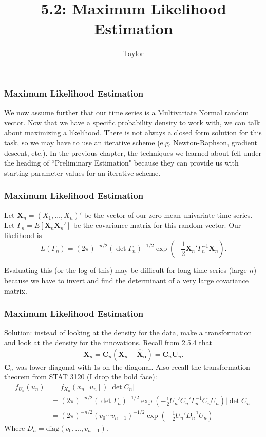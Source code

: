 \documentclass{beamer}
\title["5.2"]{5.2: Maximum Likelihood Estimation}
\author{Taylor}
\institute[UVA] 
{
University of Virginia \\
\medskip
\textit{} 
}
\date{}
\begin{document}

\begin{frame}
\titlepage 
\end{frame}

\begin{frame}
\frametitle{Maximum Likelihood Estimation}

We now assume further that our time series is a Multivariate Normal random vector. Now that we have a specific probability density to work with, we can talk about maximizing a likelihood. There is not always a closed form solution for this task, so we may have to use an iterative scheme (e.g. Newton-Raphson, gradient descent, etc.). In the previous chapter, the techniques we learned about fell under the heading of ``Preliminary Estimation" because they can provide us with starting parameter values for an iterative scheme. 

\end{frame}
\begin{frame}
\frametitle{Maximum Likelihood Estimation}
Let $\mathbf{X}_n = (X_1, \ldots, X_n)'$ be the vector of our zero-mean univariate time series. Let $\Gamma_n = E[\mathbf{X}_n\mathbf{X}_n']$ be the covariance matrix for this random vector. Our likelihood is
\[
L(\Gamma_n) = (2\pi)^{-n/2}(\det \Gamma_n)^{-1/2} \exp\left(-\frac{1}{2} \mathbf{X}_n' \Gamma_n^{-1} \mathbf{X}_n \right).
\]

Evaluating this (or the log of this) may be difficult for long time series (large $n$) because we have to invert and find the determinant of a very large covariance matrix. 
\end{frame}


\begin{frame}
\frametitle{Maximum Likelihood Estimation}

Solution: instead of looking at the density for the data, make a transformation and look at the density for the innovations. Recall from 2.5.4 that 
\[
\mathbf{X}_n = \mathbf{C}_n (\mathbf{X}_n - \mathbf{\hat{X}_n} ) = \mathbf{C}_n \mathbf{U}_n.
\]
$\mathbf{C}_n$ was lower-diagonal with $1$s on the diagonal. Also recall the transformation theorem from STAT 3120 (I drop the bold face):
\begin{align*}
f_{U_n}(u_n) &= f_{X_n}(x_n[u_n]) \left|\det C_n  \right| \\
&= (2\pi)^{-n/2}(\det \Gamma_n)^{-1/2} \exp\left(-\frac{1}{2} U_n' C_n' \Gamma_n^{-1} C_n U_n \right)\left|\det C_n  \right|\\
&= (2\pi)^{-n/2}(v_0\cdots v_{n-1})^{-1/2}\exp\left(-\frac{1}{2}U_n'D_n^{-1}U_n \right)
\end{align*}
Where $D_n = \text{diag}(v_0,\ldots,v_{n-1})$. 

\end{frame}
\end{document}
